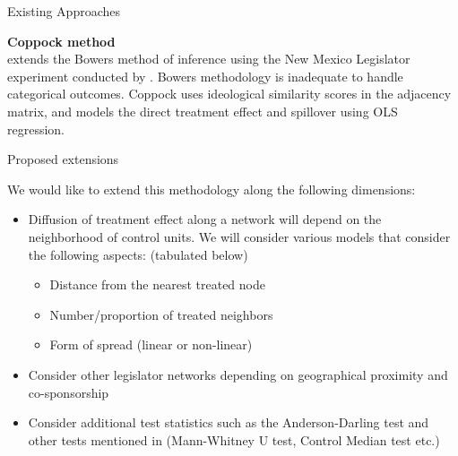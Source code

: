 \documentclass[final]{beamer}
\newlength{\onecolwid}
\newlength{\onecolwidd}
\begin{document}
\begin{frame}[t]
\begin{columns}[t]
\begin{column}{\onecolwidd}
\begin{block}{Existing Approaches}
\begin{rmfamily}
	{\Large \textbf{Coppock method}}\\
	\citealt{coppock2014information} extends the Bowers method of inference using the New Mexico Legislator experiment conducted by \citealt{butler2011can}. Bowers methodology is inadequate to handle categorical outcomes. Coppock uses ideological similarity scores in the adjacency matrix, and models the direct treatment effect and spillover using OLS regression.
	
	\end{rmfamily}
	\end{block}
	
	\hspace{2cm}
						
	
	\begin{block}{Proposed extensions}
	\begin{rmfamily}

	We would like to extend this methodology along the following dimensions:
	
	\begin{itemize}
	\item Diffusion of treatment effect along a network will depend on the neighborhood of control units. We will consider various models that consider the following aspects: (tabulated below)
	
	\begin{itemize}
	\item Distance from the nearest treated node
	\item Number/proportion of treated neighbors
	\item Form of spread (linear or non-linear)
	\end{itemize}
	
	\vspace*{.1in}
	\item Consider other legislator networks depending on geographical proximity and co-sponsorship
	\vspace*{.1in}
	\item Consider additional test statistics such as the Anderson-Darling test and other tests mentioned in \citep{rosenbaum2012interference} (Mann-Whitney U test, Control Median test etc.)
	\vspace*{.1in}
	\end{itemize}	

	\end{rmfamily}						
	\end{block}
	

\end{column}
\end{columns}
\end{frame}
\end{document}

